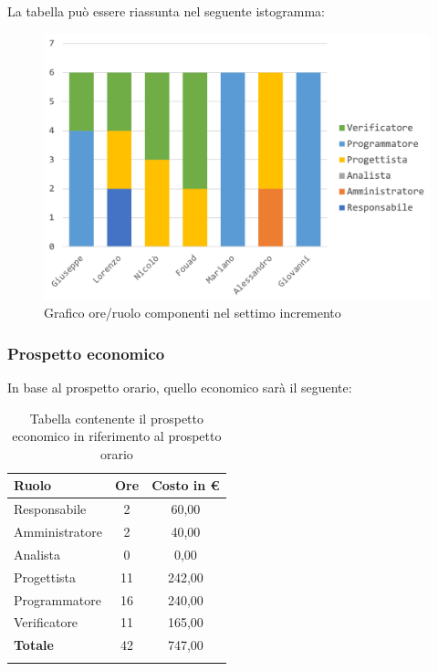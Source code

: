 		La tabella può essere riassunta nel seguente istogramma:
		\begin{figure}[H]
			\centering
			\includegraphics[width=0.8\linewidth]{./images/preventivo/incremento7-1.png}
			\caption{Grafico ore/ruolo componenti nel settimo incremento}
			\label{fig:grafico suddivione ruoli incremento VII}
		\end{figure}
		
		\subsubsection{Prospetto economico}
		In base al prospetto orario, quello economico sarà il seguente: 
		
		\begin{longtable}{|l|c|c|}
			\hline
			\rowcolor{lighter-grayer}
			\textbf{Ruolo} & \textbf{Ore} & \textbf{Costo in € } \\
			\hline
			\endfirsthead
			
			\hline
			Responsabile 	    & 2 & 60,00\\
			\hline 
			\hline
			Amministratore	   & 2 & 40,00\\
			\hline
			\hline
			Analista 				 & 0 & 0,00\\
			\hline
			\hline
			Progettista 		   & 11 & 242,00\\
			\hline
			\hline
			Programmatore 	  & 16 & 240,00\\
			\hline
			\hline
			Verificatore 		   & 11 & 165,00\\
			\hline
			\textbf{Totale} 	 & 42 & 747,00\\
			\hline
			\caption{Tabella contenente il prospetto economico in riferimento al prospetto orario}
		\end{longtable}
		\pagebreak
		
